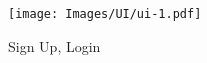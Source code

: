 
\begin{figure}[H]
	\centering
    \texttt{[image: Images/UI/ui-1.pdf]}
	\caption{\label{fig:bpmn_sign_up}Sign Up, Login}
\end{figure}